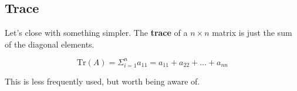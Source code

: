 \subsection{Trace}

Let's close with something simpler. The \textbf{trace} of a $n \times n$ matrix is just the sum of the diagonal elements.

\begin{equation*}
    \text{Tr} (A) = \Sigma_{i=1}^n a_{11} = a_{11} + a_{22} + ... + a_{nn}
\end{equation*}

\noindent This is less frequently used, but worth being aware of.